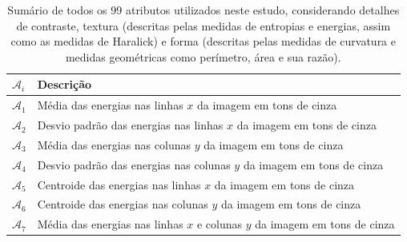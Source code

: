 \begin{table}
  \begin{center}
  \caption{\label{tab:atributos}Sumário de todos os 99 atributos utilizados
    neste estudo, considerando detalhes de contraste, textura (descritas pelas
    medidas de entropias e energias, assim como as medidas de Haralick) e forma
    (descritas pelas medidas de curvatura e medidas geométricas como perímetro,
    área e sua razão).}

  \begin{tabular}{l|l}
    \hline
    $\mathcal{A}_i$ & Descrição \\
    \hline

    $\mathcal{A}_1$ & 
    Média das energias nas linhas $x$ da imagem em tons de cinza \\

    $\mathcal{A}_2$ &
    Desvio padrão das energias nas linhas $x$ da imagem em tons de cinza \\

    $\mathcal{A}_3$ &
    Média das energias nas colunas $y$ da imagem em tons de cinza \\

    $\mathcal{A}_4$ &
    Desvio padrão das energias nas colunas $y$ da imagem em tons de cinza \\

    $\mathcal{A}_5$ &
    Centroide das energias nas linhas $x$ da imagem em tons de cinza \\

    $\mathcal{A}_6$ &
    Centroide das energias nas colunas $y$ da imagem em tons de cinza \\

    $\mathcal{A}_7$ &
    Média das energias nas linhas $x$ e colunas $y$ da imagem em tons de cinza \\


\end{tabular}
\end{center}
\end{table}
